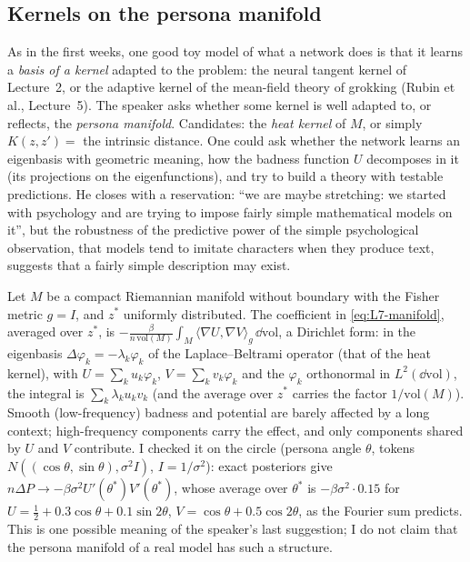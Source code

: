\subsection{Kernels on the persona manifold}\label{sec:L7-kernel}
As in the first weeks, one good toy model of what a network does is that it learns a \emph{basis of a kernel} adapted to the problem: the neural tangent kernel of Lecture~2, or the adaptive kernel of the mean-field theory of grokking (Rubin et al., Lecture~5). The speaker asks whether some kernel is well adapted to, or reflects, the \emph{persona manifold}. Candidates: the \emph{heat kernel} of $M$, or simply $K(z,z')=$ the intrinsic distance. One could ask whether the network learns an eigenbasis with geometric meaning, how the badness function $U$ decomposes in it (its projections on the eigenfunctions), and try to build a theory with testable predictions.
He closes with a reservation: ``we are maybe stretching: we started with psychology and are trying to impose fairly simple mathematical models on it'', but the robustness of the predictive power of the simple psychological observation, that models tend to imitate characters when they produce text, suggests that a fairly simple description may exist.

\begin{beyond}\label{box:L7-dirichlet}
Let $M$ be a compact Riemannian manifold without boundary with the Fisher metric $g=I$, and $z^*$ uniformly distributed. The coefficient in \eqref{eq:L7-manifold}, averaged over $z^*$, is $-\frac\beta{n\,\mathrm{vol}(M)}\int_M\langle\nabla U,\nabla V\rangle_g\,\dd\mathrm{vol}$, a Dirichlet form: in the eigenbasis $\Delta\varphi_k=-\lambda_k\varphi_k$ of the Laplace--Beltrami operator (that of the heat kernel), with $U=\sum_ku_k\varphi_k$, $V=\sum_kv_k\varphi_k$ and the $\varphi_k$ orthonormal in $L^2(\dd\mathrm{vol})$, the integral is $\sum_k\lambda_ku_kv_k$ (and the average over $z^*$ carries the factor $1/\mathrm{vol}(M)$). Smooth (low-frequency) badness and potential are barely affected by a long context; high-frequency components carry the effect, and only components shared by $U$ and $V$ contribute. I checked it on the circle (persona angle $\theta$, tokens $N((\cos\theta,\sin\theta),\sigma^2I)$, $I=1/\sigma^2$): exact posteriors give $n\Delta P\to-\beta\sigma^2U'(\theta^*)V'(\theta^*)$, whose average over $\theta^*$ is $-\beta\sigma^2\cdot0.15$ for $U=\frac12+0.3\cos\theta+0.1\sin2\theta$, $V=\cos\theta+0.5\cos2\theta$, as the Fourier sum predicts. This is one possible meaning of the speaker's last suggestion; I do not claim that the persona manifold of a real model has such a structure.
\end{beyond}

